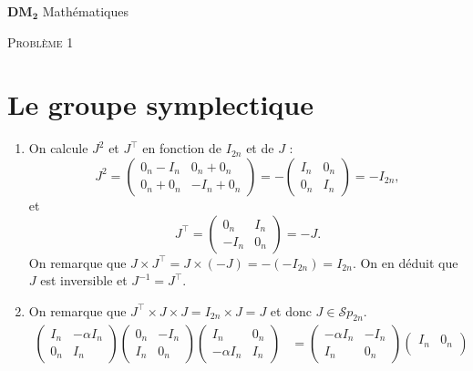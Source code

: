 \documentclass[a4paper]{article}
\begin{document}
	\begin{center}
		\Huge $\mathbf{DM_2}$\/ Mathématiques
	\end{center}

	\begin{center}
		\LARGE \scshape Problème 1
	\end{center}

	\section*{Le groupe symplectique}

	\begin{enumerate}
		\item On calcule $J^2$\/ et $J^\top$ en fonction de $I_{2n}$\/ et de $J$\/ : \[
				J^2 = \begin{pmatrix}
					0_n - I_{n} & 0_n + 0_n\\
					0_n + 0_n & -I_n + 0_n
				\end{pmatrix} = -\begin{pmatrix}
					I_n&0_n\\
					0_n&I_n
				\end{pmatrix} = -I_{2n},
			\] et \[
				J^\top = \begin{pmatrix}
					0_n & I_n\\
					-I_n&0_n
				\end{pmatrix} = -J
			.\] On remarque que $J \times J^\top = J \times (-J) = -(-I_{2n}) = I_{2n}$. On en déduit que $J$\/ est inversible et $J^{-1} = J^\top$.
		\item On remarque que $J^\top \times J \times J = I_{2n} \times J = J$\/ et donc $J \in \mathcal{S}p_{2n}$.
			\begin{align*}
				\begin{pmatrix}
					I_n&-\alpha I_n\\
					0_n&I_n
				\end{pmatrix} \begin{pmatrix}
					0_n&-I_n\\
					I_n&0_n
				\end{pmatrix} \begin{pmatrix}
					I_n&0_n\\
					-\alpha I_n&I_n
				\end{pmatrix}
				&=
				\begin{pmatrix}
					-\alpha I_n & -I_n\\
					I_n&0_n
				\end{pmatrix} \begin{pmatrix}
					I_n&0_n\\

\end{pmatrix}
\end{align*}
\end{enumerate}
\end{document}
